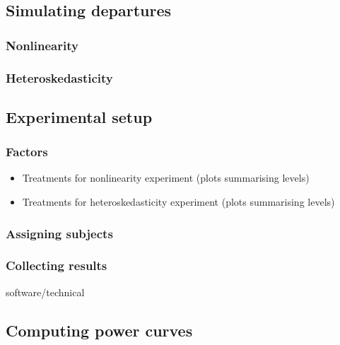 \documentclass[]{interact}
\theoremstyle{plain}%
\theoremstyle{definition}
\theoremstyle{remark}
\providecommand{\tightlist}{%
  \setlength{\itemsep}{0pt}\setlength{\parskip}{0pt}}
\def\tightlist{}
\begin{document}
\hypertarget{simulating-departures}{%
\subsection{Simulating departures}\label{simulating-departures}}

\hypertarget{nonlinearity}{%
\subsubsection{Nonlinearity}\label{nonlinearity}}

\hypertarget{heteroskedasticity}{%
\subsubsection{Heteroskedasticity}\label{heteroskedasticity}}

\hypertarget{experimental-setup}{%
\subsection{Experimental setup}\label{experimental-setup}}

\hypertarget{factors}{%
\subsubsection{Factors}\label{factors}}

\begin{itemize}
\tightlist
\item
  Treatments for nonlinearity experiment (plots summarising levels)
\item
  Treatments for heteroskedasticity experiment (plots summarising
  levels)
\end{itemize}

\hypertarget{assigning-subjects}{%
\subsubsection{Assigning subjects}\label{assigning-subjects}}

\hypertarget{collecting-results}{%
\subsubsection{Collecting results}\label{collecting-results}}

software/technical

\hypertarget{computing-power-curves}{%
\subsection{Computing power curves}\label{computing-power-curves}}
\end{document}
